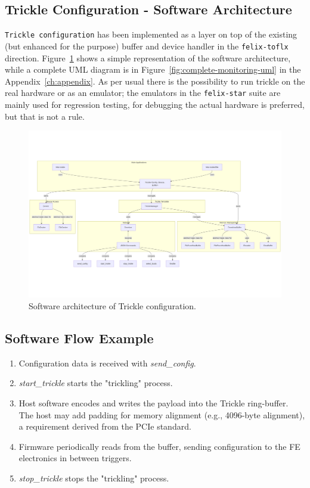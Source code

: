 \subsection{Trickle Configuration - Software Architecture}

\texttt{Trickle configuration} \cite{felix-star-trickle-configuration} has been implemented as a layer on top of the existing (but enhanced for the purpose) buffer and device handler in the \texttt{felix-toflx} direction. Figure~\ref{fig:trickle-software-architecture} shows a simple representation of the software architecture, while a complete UML diagram is in Figure~\ref{fig:complete-monitoring-uml} in the Appendix~\ref{ch:appendix}. As per usual there is the possibility to run trickle on the real hardware or as an emulator; the emulators in the \texttt{felix-star} suite are mainly used for regression testing, for debugging the actual hardware is preferred, but that is not a rule.

\begin{figure}[htbp]
\centering
\includegraphics[width=\textwidth]{images/contributions/trickle-architecture.png}
\caption{Software architecture of Trickle configuration.}
\label{fig:trickle-software-architecture}
\end{figure}

\subsection{Software Flow Example}
\begin{enumerate}
    \item Configuration data is received with \textit{send\_config}.
    \item \textit{start\_trickle} starts the "trickling" process.
    \item Host software encodes and writes the payload into the Trickle ring-buffer. The host may add padding for memory alignment (e.g., 4096-byte alignment), a requirement derived from the \acs{PCIe} standard.
    \item Firmware periodically reads from the buffer, sending configuration to the \acs{FE} electronics in between triggers.
    \item \textit{stop\_trickle} stops the "trickling" process.
\end{enumerate}

